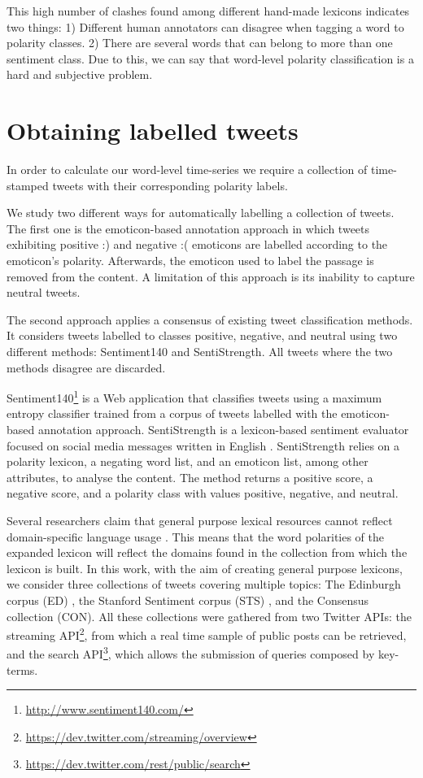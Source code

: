 \documentclass{sig-alternate}
\begin{document}
This high number of clashes found among different hand-made lexicons indicates two things: 1) Different human annotators can disagree when tagging a word to polarity classes. 2) There are several words that can belong to more than one sentiment class.  
Due to this, we can say that word-level polarity classification is a hard and subjective problem.  




\section{Obtaining labelled tweets}\label{sec:tweetlab}

In order to calculate our word-level time-series we require a collection of time-stamped tweets with their corresponding polarity labels. 

We study two different ways for automatically labelling a collection of tweets. 
The first one is the emoticon-based annotation approach in which tweets exhibiting positive :) and negative :( emoticons are labelled according to the emoticon's polarity. Afterwards, the emoticon used to label the passage is removed from the content. A limitation of this approach is its inability to capture neutral tweets. 

The second approach applies a consensus of existing tweet classification methods. It considers tweets labelled to classes positive, negative, and neutral using two different methods: Sentiment140 and SentiStrength. All tweets where the two methods disagree are discarded.  

Sentiment140\footnote{\url{http://www.sentiment140.com/}} is a Web application that classifies tweets using a maximum entropy classifier \cite{go2010} trained from a corpus of tweets labelled with the emoticon-based annotation approach. SentiStrength is a lexicon-based sentiment evaluator focused on social media messages written in English \cite{ThelwallBP12}. SentiStrength relies on a polarity lexicon, a negating word list, and an emoticon list, among other attributes, to analyse the content. The method returns a positive score, a negative score, and a polarity class with values positive, negative, and neutral.

Several researchers claim that general purpose lexical resources cannot reflect domain-specific language usage \cite{Choi2009, Zhou2014}. This means that the word polarities of the expanded lexicon will reflect the domains found in the collection from which the lexicon is built.  In this work, with the aim of creating general purpose lexicons, we consider three  collections of tweets covering multiple topics: The Edinburgh corpus (ED) \cite{Petrovic2010}, the Stanford Sentiment corpus (STS) \cite{go2010}, and the Consensus collection (CON). All these collections were gathered from  two Twitter APIs: the streaming API\footnote{\url{https://dev.twitter.com/streaming/overview}}, from which a real time sample of public posts can be retrieved, and the search API\footnote{\url{https://dev.twitter.com/rest/public/search}}, which allows the submission of queries composed by key-terms.
\end{document}
